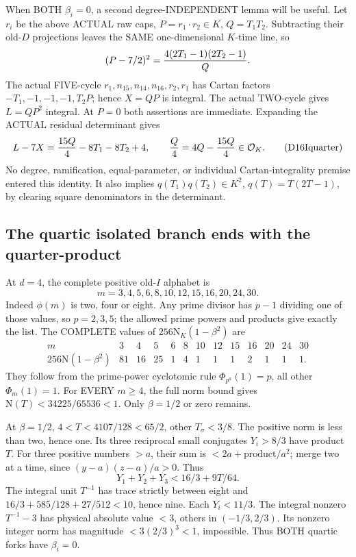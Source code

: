 \documentclass[11pt]{article}
\begin{document}
When BOTH \(\beta_i=0\), a second
degree-INDEPENDENT lemma will be useful.
Let \(r_i\) be the above ACTUAL raw
caps, \(P=r_1\cdot r_2\in K\),
\(Q=T_1T_2\).
Subtracting their old-\(D\) projections
leaves the SAME one-dimensional
\(K\)-time line, so
\[
                   (P-7/2)^2=
                     {4(2T_1-1)(2T_2-1)\over Q}.
\]
The actual FIVE-cycle
\(r_1,n_{15},n_{14},n_{16},r_2,r_1\)
has Cartan factors
\(-T_1,-1,-1,-1,T_2P\);
hence \(X=QP\) is integral.
The actual TWO-cycle gives
\(L=QP^2\) integral.
At \(P=0\) both assertions are immediate.
Expanding the ACTUAL residual determinant
gives
\[
 L-7X={15Q\over4}-8T_1-8T_2+4,\qquad
          {Q\over4}=4Q-{15Q\over4}\in\mathcal O_K .
\tag{D16Iquarter}\label{eq:arithD16Iquarterproduct}
\]
No degree, ramification, equal-parameter,
or individual Cartan-integrality premise
entered this identity.
It also implies
\(q(T_1)q(T_2)\in K^2\),
\(q(T)=T(2T-1)\), by clearing square
denominators in the determinant.

\subsection{The quartic isolated branch ends with the quarter-product}
\label{app:arithD16Iquartic}

At \(d=4\), the complete positive
old-\(I\) alphabet is
\[
                m=3,4,5,6,8,10,12,15,16,20,24,30 .
\]
Indeed \(\phi(m)\) is two, four or
eight.
Any prime divisor has \(p-1\) dividing
one of those values, so \(p=2,3,5\);
the allowed prime powers and products
give exactly the list.
The COMPLETE values of
\(256\mathrm N_K(1-\beta^2)\)
are
\[
\begin{array}{c|rrrrrrrrrrrr}
m&3&4&5&6&8&10&12&15&16&20&24&30\\ \hline
256\mathrm N(1-\beta^2)&81&16&25&1&4&1&1&1&2&1&1&1 .
\end{array}
\]
They follow from the prime-power
cyclotomic rule \(\Phi_{p^a}(1)=p\),
all other \(\Phi_m(1)=1\).
For EVERY \(m\ge4\), the full norm
bound gives
\(\mathrm N(T)<34225/65536<1\).
Only \(\beta=1/2\) or zero remains.

At \(\beta=1/2\),
\(4<T<4107/128<65/2\), other
\(T_\sigma<3/8\).
The positive norm is less than two,
hence one.
Its three reciprocal small conjugates
\(Y_i>8/3\) have product \(T\).
For three positive numbers \(>a\),
their sum is \(<2a+\text{product}/a^2\);
merge two at a time, since
\((y-a)(z-a)/a>0\).
Thus
\[
                    Y_1+Y_2+Y_3<16/3+9T/64 .
\]
The integral unit \(T^{-1}\) has trace
strictly between eight and
\(16/3+585/128+27/512<10\), hence nine.
Each \(Y_i<11/3\).
The integral nonzero \(T^{-1}-3\)
has physical absolute value \(<3\),
others in \((-1/3,2/3)\).
Its nonzero integer norm has magnitude
\(<3(2/3)^3<1\), impossible.
Thus BOTH quartic forks have
\(\beta_i=0\).
\end{document}
